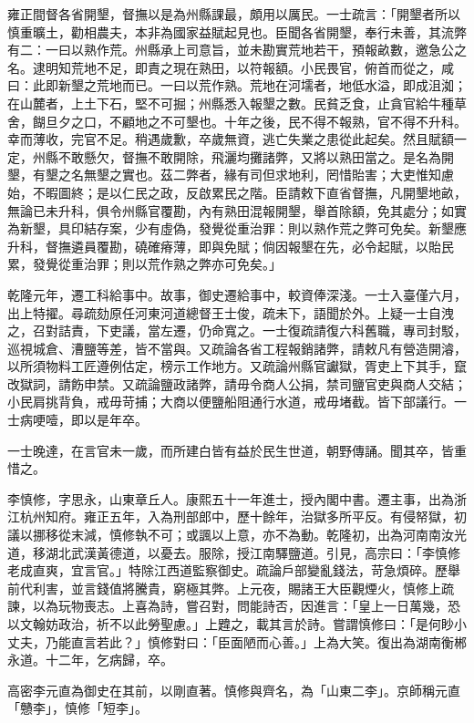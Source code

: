 \begin{pinyinscope}
雍正間督各省開墾，督撫以是為州縣課最，頗用以厲民。一士疏言：「開墾者所以慎重曠土，勸相農夫，本非為國家益賦起見也。臣聞各省開墾，奉行未善，其流弊有二：一曰以熟作荒。州縣承上司意旨，並未勘實荒地若干，預報畝數，邀急公之名。逮明知荒地不足，即責之現在熟田，以符報額。小民畏官，俯首而從之，咸曰：此即新墾之荒地而已。一曰以荒作熟。荒地在河壖者，地低水溢，即成沮洳；在山麓者，上土下石，堅不可掘；州縣悉入報墾之數。民貧乏食，止貪官給牛種草舍，餬旦夕之口，不顧地之不可墾也。十年之後，民不得不報熟，官不得不升科。幸而薄收，完官不足。稍遇歲歉，卒歲無資，逃亡失業之患從此起矣。然且賦額一定，州縣不敢懸欠，督撫不敢開除，飛灑均攤諸弊，又將以熟田當之。是名為開墾，有墾之名無墾之實也。茲二弊者，緣有司但求地利，罔惜貽害；大吏惟知慮始，不暇圖終；是以仁民之政，反啟累民之階。臣請敕下直省督撫，凡開墾地畝，無論已未升科，俱令州縣官覆勘，內有熟田混報開墾，舉首除額，免其處分；如實為新墾，具印結存案，少有虛偽，發覺從重治罪：則以熟作荒之弊可免矣。新墾應升科，督撫遴員覆勘，磽確瘠薄，即與免賦；倘因報墾在先，必令起賦，以貽民累，發覺從重治罪；則以荒作熟之弊亦可免矣。」

乾隆元年，遷工科給事中。故事，御史遷給事中，較資俸深淺。一士入臺僅六月，出上特擢。尋疏劾原任河東河道總督王士俊，疏未下，語聞於外。上疑一士自洩之，召對詰責，下吏議，當左遷，仍命寬之。一士復疏請復六科舊職，專司封駁，巡視城倉、漕鹽等差，皆不當與。又疏論各省工程報銷諸弊，請敕凡有營造開濬，以所須物料工匠遵例估定，榜示工作地方。又疏論州縣官讞獄，胥吏上下其手，竄改獄詞，請飭申禁。又疏論鹽政諸弊，請毋令商人公捐，禁司鹽官吏與商人交結；小民肩挑背負，戒毋苛捕；大商以便鹽船阻通行水道，戒毋堵截。皆下部議行。一士病哽噎，即以是年卒。

一士晚達，在言官未一歲，而所建白皆有益於民生世道，朝野傳誦。聞其卒，皆重惜之。

李慎修，字思永，山東章丘人。康熙五十一年進士，授內閣中書。遷主事，出為浙江杭州知府。雍正五年，入為刑部郎中，歷十餘年，治獄多所平反。有侵帑獄，初議以挪移從末減，慎修執不可；或諷以上意，亦不為動。乾隆初，出為河南南汝光道，移湖北武漢黃德道，以憂去。服除，授江南驛鹽道。引見，高宗曰：「李慎修老成直爽，宜言官。」特除江西道監察御史。疏論戶部變亂錢法，苛急煩碎。歷舉前代利害，並言錢值將騰貴，窮極其弊。上元夜，賜諸王大臣觀煙火，慎修上疏諫，以為玩物喪志。上喜為詩，嘗召對，問能詩否，因進言：「皇上一日萬幾，恐以文翰妨政治，祈不以此勞聖慮。」上韙之，載其言於詩。嘗謂慎修曰：「是何眇小丈夫，乃能直言若此？」慎修對曰：「臣面陋而心善。」上為大笑。復出為湖南衡郴永道。十二年，乞病歸，卒。

高密李元直為御史在其前，以剛直著。慎修與齊名，為「山東二李」。京師稱元直「戇李」，慎修「短李」。


\end{pinyinscope}
